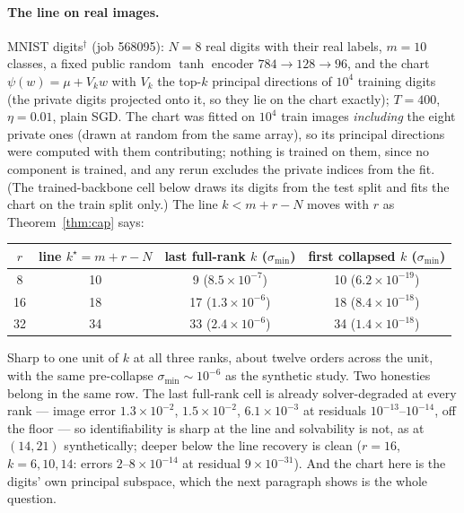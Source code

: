 \paragraph{The line on real images.} MNIST digits$^\dagger$ (job 568095):
$N=8$ real digits with their real labels, $m=10$ classes, a fixed public
random $\tanh$ encoder $784\to128\to96$, and the chart $\psi(w)=\mu+V_kw$
with $V_k$ the top-$k$ principal directions of $10^4$ training digits (the
private digits projected onto it, so they lie on the chart exactly); $T=400$,
$\eta=0.01$, plain SGD. The chart was fitted on $10^4$ train images \emph{including} the eight
private ones (drawn at random from the same array), so its principal
directions were computed with them contributing; nothing is trained on
them, since no component is trained, and any rerun excludes the private
indices from the fit. (The trained-backbone cell below draws its digits from
the test split and fits the chart on the train split only.) The line $k<m+r-N$ moves with $r$ as
Theorem~\ref{thm:cap} says:
\begin{center}\small
\begin{tabular}{@{}cccc@{}}\toprule
$r$ & line $k^\star=m+r-N$ & last full-rank $k$ ($\sigma_{\min}$) & first collapsed $k$ ($\sigma_{\min}$)\\ \midrule
8  & 10 & 9 ($8.5\times10^{-7}$) & 10 ($6.2\times10^{-19}$)\\
16 & 18 & 17 ($1.3\times10^{-6}$) & 18 ($8.4\times10^{-18}$)\\
32 & 34 & 33 ($2.4\times10^{-6}$) & 34 ($1.4\times10^{-18}$)\\ \bottomrule
\end{tabular}
\end{center}
Sharp to one unit of $k$ at all three ranks, about twelve orders across the
unit, with the same pre-collapse $\sigma_{\min}\sim10^{-6}$ as the synthetic
study. Two honesties belong in the same row. The last full-rank cell is
already solver-degraded at every rank — image error $1.3\times10^{-2}$,
$1.5\times10^{-2}$, $6.1\times10^{-3}$ at residuals $10^{-13}$--$10^{-14}$,
off the floor — so identifiability is sharp at the line and solvability is
not, as at $(14,21)$ synthetically; deeper below the line recovery is clean
($r=16$, $k=6,10,14$: errors $2$--$8\times10^{-14}$ at residual
$9\times10^{-31}$). And the chart here is the digits' own principal subspace,
which the next paragraph shows is the whole question.

